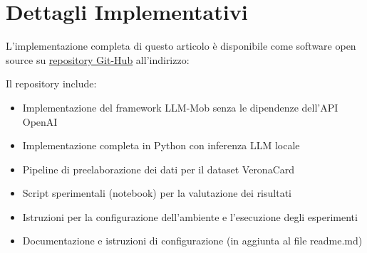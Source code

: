 \section{Dettagli Implementativi}

L'implementazione completa di questo articolo è disponibile come software open source su \href{https://github.com/simo-hue/LLM-Mob-As-Mobility-Interpreter.git}{repository Git-Hub} all'indirizzo:

Il repository include:
\begin{itemize}
\item Implementazione del framework LLM-Mob senza le dipendenze dell'API OpenAI
\item Implementazione completa in Python con inferenza LLM locale
\item Pipeline di preelaborazione dei dati per il dataset VeronaCard
\item Script sperimentali (notebook) per la valutazione dei risultati
\item Istruzioni per la configurazione dell'ambiente e l'esecuzione degli esperimenti
\item Documentazione e istruzioni di configurazione (in aggiunta al file readme.md)
\end{itemize}

